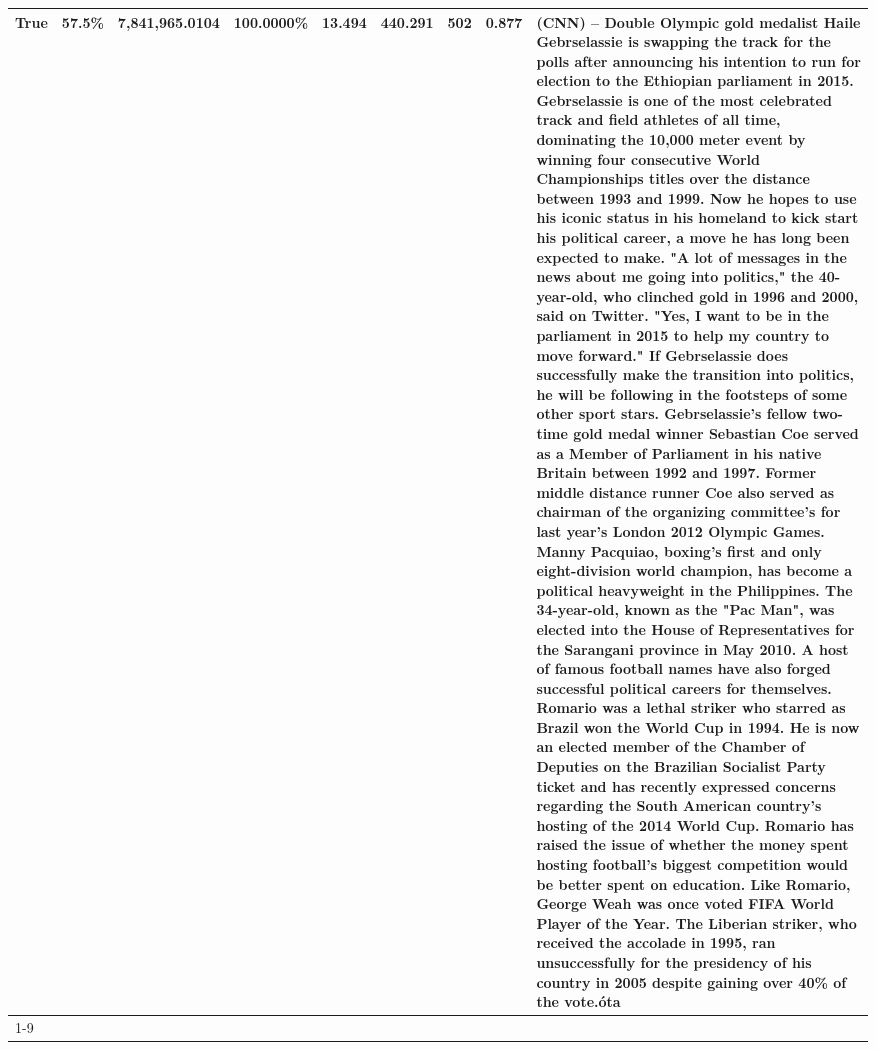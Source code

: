 \begin{table}[H]
{\begin{tabular}{lllrlllll}
True & 57.5\% & 7,841,965.0104 & \bfseries \color{red} 100.0000\% & 13.494 & 440.291 & 502 & 0.877 & (CNN) -- Double Olympic gold medalist Haile Gebrselassie is swapping the track for the polls after announcing his intention to run for election to the Ethiopian parliament in 2015. Gebrselassie is one of the most celebrated track and field athletes of all time, dominating the 10,000 meter event by winning four consecutive World Championships titles over the distance between 1993 and 1999. Now he hopes to use his iconic status in his homeland to kick start his political career, a move he has long been expected to make. "A lot of messages in the news about me going into politics," the 40-year-old, who clinched gold in 1996 and 2000, said on Twitter. "Yes, I want to be in the parliament in 2015 to help my country to move forward." If Gebrselassie does successfully make the transition into politics, he will be following in the footsteps of some other sport stars. Gebrselassie's fellow two-time gold medal winner Sebastian Coe served as a Member of Parliament in his native Britain between 1992 and 1997. Former middle distance runner Coe also served as chairman of the organizing committee's for last year's London 2012 Olympic Games. Manny Pacquiao, boxing's first and only eight-division world champion, has become a political heavyweight in the Philippines. The 34-year-old, known as the "Pac Man", was elected into the House of Representatives for the Sarangani province in May 2010. A host of famous football names have also forged successful political careers for themselves. Romario was a lethal striker who starred as Brazil won the World Cup in 1994. He is now an elected member of the Chamber of Deputies on the Brazilian Socialist Party ticket and has recently expressed concerns regarding the South American country's hosting of the 2014 World Cup. Romario has raised the issue of whether the money spent hosting football's biggest competition would be better spent on education. Like Romario, George Weah was once voted FIFA World Player of the Year. The Liberian striker, who received the accolade in 1995, ran unsuccessfully for the presidency of his country in 2005 despite gaining over 40\% of the vote.óta \\
\cline{1-9}

\end{tabular}}
\end{table}
